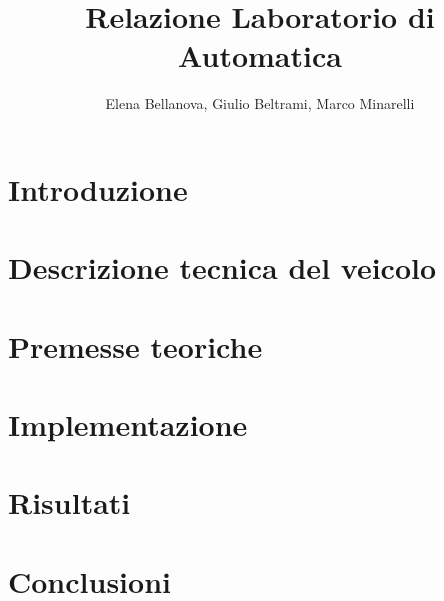 \documentclass{article}
\title{Relazione Laboratorio di  Automatica}
\author{Elena Bellanova, Giulio Beltrami, Marco Minarelli}
\date{}
\begin{document}
\maketitle
\tableofcontents
\clearpage
\section{Introduzione}


\section{Descrizione tecnica del veicolo} 


\section{Premesse teoriche}


\section{Implementazione}


\section{Risultati}


\section{Conclusioni}


\nocite{*}


\end{document}
